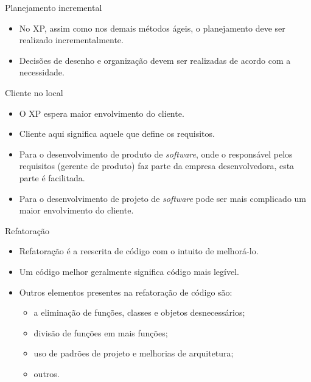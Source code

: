 \documentclass[11pt]{beamer}
\begin{document}
    \begin{frame}{Planejamento incremental}
      \begin{itemize}
         \item No XP, assim como nos demais métodos ágeis, o planejamento deve ser realizado incrementalmente.
         \item Decisões de desenho e organização devem ser realizadas de acordo com a necessidade.
      \end{itemize}
    \end{frame}

    \begin{frame}{Cliente no local}
      \begin{itemize}
         \item O XP espera maior envolvimento do cliente.
         \item Cliente aqui significa aquele que define os requisitos.
         \item Para o desenvolvimento de produto de \textit{software}, onde o responsável pelos requisitos (gerente de produto) faz parte da empresa desenvolvedora, esta parte é facilitada.
         \item Para o desenvolvimento de projeto de \textit{software} pode ser mais complicado um maior envolvimento do cliente.
      \end{itemize}
    \end{frame}

    \begin{frame}{Refatoração}
      \begin{itemize}
         \item Refatoração é a reescrita de código com o intuito de melhorá-lo.
         \item Um código melhor geralmente significa código mais legível.
         \item Outros elementos presentes na refatoração de código são:
         \begin{itemize}
          \item a eliminação de funções, classes e objetos desnecessários;
          \item divisão de funções em mais funções;
          \item uso de padrões de projeto e melhorias de arquitetura;
          \item outros.
         \end{itemize}
      \end{itemize}
    \end{frame}
\end{document}
